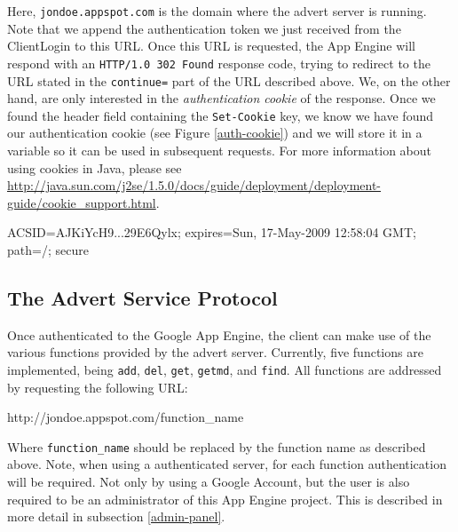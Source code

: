 Here, \texttt{jondoe.appspot.com} is the domain where the advert server is
running. Note that we append the authentication token we just received from the
ClientLogin to this URL. Once this URL is requested, the App Engine will
respond with an \texttt{HTTP/1.0 302 Found} response code, trying to redirect
to the URL stated in the \texttt{continue=} part of the URL described above.
We, on the other hand, are only interested in the \emph{authentication cookie}
of the response. Once we found the header field containing the
\texttt{Set-Cookie} key, we know we have found our authentication cookie (see
Figure \ref{auth-cookie}) and we will store it in a variable so it can be used
in subsequent requests. For more information about using cookies in Java,
please see
\url{http://java.sun.com/j2se/1.5.0/docs/guide/deployment/deployment-guide/cookie\_support.html}.

\begin{figure*}[ht] %
\begin{center}
\begin{code}
ACSID=AJKiYcH9...29E6Qylx; expires=Sun, 17-May-2009 12:58:04 GMT;
    path=/; secure
\end{code}
\caption{Authentication Cookie.\label{auth-cookie}}
\end{center}
\end{figure*}

\subsection{The Advert Service Protocol}
\label{protocol}
Once authenticated to the Google App Engine, the client can make use of the
various functions provided by the advert server. Currently, five functions are
implemented, being \texttt{add}, \texttt{del}, \texttt{get}, \texttt{getmd},
and \texttt{find}. All functions are addressed by requesting the following URL:

\begin{center}
\begin{code}
http://jondoe.appspot.com/function_name
\end{code}
\end{center}

Where \texttt{function\_name} should be replaced by the function name as
described above. Note, when using a authenticated server, for each function
authentication will be required. Not only by using a Google Account, but
the user is also required to be an administrator of this App Engine project.
This
is described in more detail in subsection \ref{admin-panel}.

